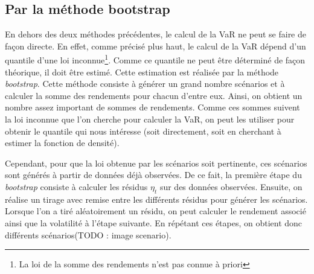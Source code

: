 		\subsection{Par la méthode bootstrap}
		\label{subsubsection:methode-bootstrap}
			En dehors des deux méthodes précédentes, le calcul de la VaR ne peut se faire de façon directe. En effet, comme précisé plus haut, le calcul de la VaR dépend d'un quantile d'une loi inconnue\footnote{La loi de la somme des rendements n'est pas connue à priori}. Comme ce quantile ne peut être déterminé de façon théorique, il doit être estimé. Cette estimation est réalisée par la méthode \textit{bootstrap}. Cette méthode consiste à générer un grand nombre scénarios et à calculer la somme des rendements pour chacun d'entre eux. Ainsi, on obtient un nombre assez important de sommes de rendements. Comme ces sommes suivent la loi inconnue que l'on cherche pour calculer la VaR, on peut les utiliser pour obtenir le quantile qui nous intéresse (soit directement, soit en cherchant à estimer la fonction de densité).

			Cependant, pour que la loi obtenue par les scénarios soit pertinente, ces scénarios sont générés à partir de données déjà observées. De ce fait, la première étape du \textit{bootstrap} consiste à calculer les résidus $\eta_t$ sur des données observées. Ensuite, on réalise un tirage avec remise entre les différents résidus pour générer les scénarios. Lorsque l'on a tiré aléatoirement un résidu, on peut calculer le rendement associé ainsi que la volatilité à l'étape suivante. En répétant ces étapes, on obtient donc différents scénarios(TODO : image scenario).